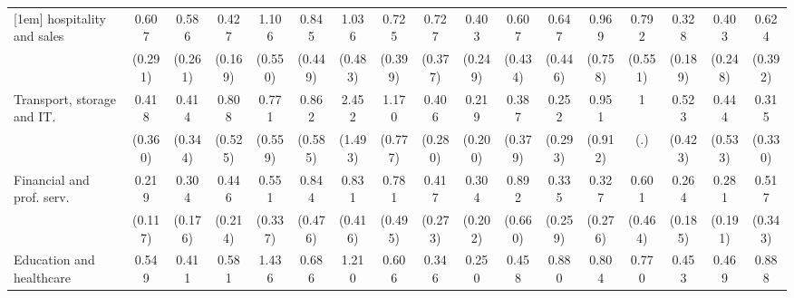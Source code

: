 {\begin{tabular}{l*{16}{c}}
[1em]
hospitality and sales&       0.607         &       0.586         &       0.427\sym{*}  &       1.106         &       0.845         &       1.036         &       0.725         &       0.727         &       0.403         &       0.607         &       0.647         &       0.969         &       0.792         &       0.328         &       0.403         &       0.624         \\
                    &     (0.291)         &     (0.261)         &     (0.169)         &     (0.550)         &     (0.449)         &     (0.483)         &     (0.399)         &     (0.377)         &     (0.249)         &     (0.434)         &     (0.446)         &     (0.758)         &     (0.551)         &     (0.189)         &     (0.248)         &     (0.392)         \\
[1em]
Transport, storage and IT.&       0.418         &       0.414         &       0.808         &       0.771         &       0.862         &       2.452         &       1.170         &       0.406         &       0.219         &       0.387         &       0.252         &       0.951         &           1         &       0.523         &       0.444         &       0.315         \\
                    &     (0.360)         &     (0.344)         &     (0.525)         &     (0.559)         &     (0.585)         &     (1.493)         &     (0.777)         &     (0.280)         &     (0.200)         &     (0.379)         &     (0.293)         &     (0.912)         &         (.)         &     (0.423)         &     (0.533)         &     (0.330)         \\
[1em]
Financial and prof. serv.&       0.219\sym{**} &       0.304\sym{*}  &       0.446         &       0.551         &       0.844         &       0.831         &       0.781         &       0.417         &       0.304         &       0.892         &       0.335         &       0.327         &       0.601         &       0.264         &       0.281         &       0.517         \\
                    &     (0.117)         &     (0.176)         &     (0.214)         &     (0.337)         &     (0.476)         &     (0.416)         &     (0.495)         &     (0.273)         &     (0.202)         &     (0.660)         &     (0.259)         &     (0.276)         &     (0.464)         &     (0.185)         &     (0.191)         &     (0.343)         \\
[1em]
Education and healthcare&       0.549         &       0.411         &       0.581         &       1.436         &       0.686         &       1.210         &       0.606         &       0.346         &       0.250\sym{*}  &       0.458         &       0.880         &       0.804         &       0.770         &       0.453         &       0.469         &       0.888         \\

\end{tabular}}

